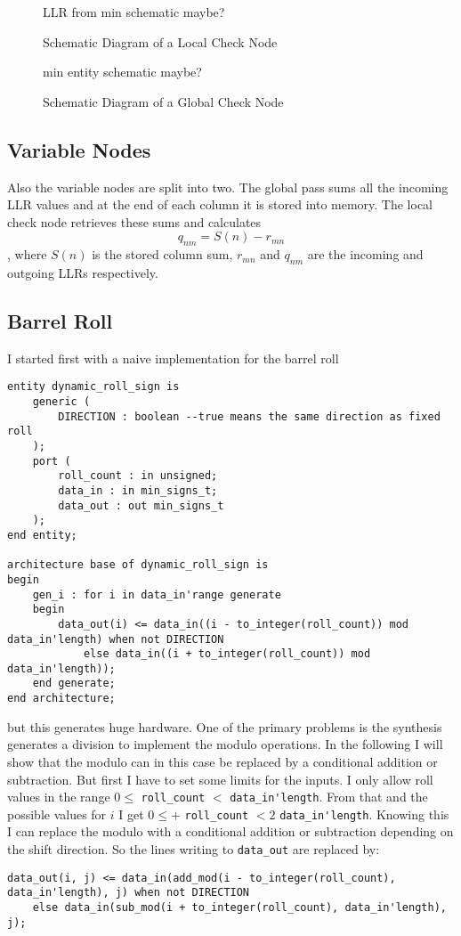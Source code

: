 \begin{figure}
    LLR from min schematic maybe?
    \centering
    \caption{Schematic Diagram of a Local Check Node}
\end{figure}

\begin{figure}
    min entity schematic maybe?
    \centering
    \caption{Schematic Diagram of a Global Check Node}
\end{figure}

\subsection{Variable Nodes}
Also the variable nodes are split into two. The global pass sums all the incoming LLR values and at the end of each column it is stored into memory. The local check node retrieves these sums and calculates
\begin{equation}
    q_{nm} = S(n) - r_{mn}
\end{equation}
, where $S(n)$ is the stored column sum, $r_{mn}$ and $q_{nm}$ are the incoming and outgoing LLRs respectively.

\subsection{Barrel Roll}
I started first with a naive implementation for the barrel roll
\begin{lstlisting}[style=vhdl]
    entity dynamic_roll_sign is
	generic (
		DIRECTION : boolean --true means the same direction as fixed roll
	);
    port (
		roll_count : in unsigned;
        data_in : in min_signs_t;
		data_out : out min_signs_t
    );
end entity;

architecture base of dynamic_roll_sign is
begin
    gen_i : for i in data_in'range generate
    begin
        data_out(i) <= data_in((i - to_integer(roll_count)) mod data_in'length) when not DIRECTION 
            else data_in((i + to_integer(roll_count)) mod data_in'length));
    end generate;
end architecture;
\end{lstlisting}
but this generates huge hardware. One of the primary problems is the synthesis generates a division to implement the modulo operations. In the following I will show that the modulo can in this case be replaced by a conditional addition or subtraction. But first I have to set some limits for the inputs. I only allow roll values in the range $0 \leq$ \lstinline{roll_count} $<$ \lstinline{data_in'length}. From that and the possible values for $i$ I get $0 \leq + $ \lstinline{roll_count} $ < 2$ \lstinline{data_in'length}. Knowing this I can replace the modulo with a conditional addition or subtraction depending on the shift direction. So the lines writing to \lstinline{data_out} are replaced by:
\begin{lstlisting}
data_out(i, j) <= data_in(add_mod(i - to_integer(roll_count), data_in'length), j) when not DIRECTION 
    else data_in(sub_mod(i + to_integer(roll_count), data_in'length), j);
\end{lstlisting}

